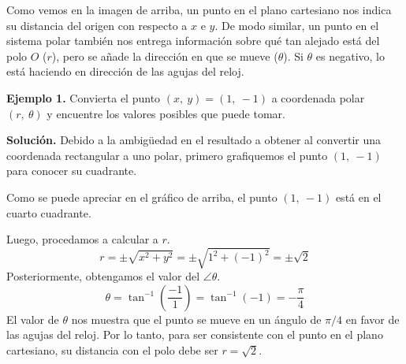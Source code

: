 \documentclass[12pt]{article}
\begin{document}
Como vemos en la imagen de arriba, un punto en el plano cartesiano nos indica su distancia del origen con respecto a $x$ e $y$. De modo similar, un punto en el sistema polar también nos entrega información sobre qué tan alejado está del polo $O$ ($r$), pero se añade la dirección en que se mueve ($\theta$). Si $\theta$ es negativo, lo está haciendo en dirección de las agujas del reloj.

\textbf{Ejemplo 1.} Convierta el punto $(x, \ y) = (1, \ -1)$ a coordenada polar $(r, \ \theta)$ y encuentre los valores posibles que puede tomar.

\textbf{Solución.} Debido a la ambigüedad en el resultado a obtener al convertir una coordenada rectangular a uno polar, primero grafiquemos el punto $(1, \ -1)$ para conocer su cuadrante.

\begin{figure}[hbt!]

\centering


\end{figure}

Como se puede apreciar en el gráfico de arriba, el punto $(1, \ -1)$ está en el cuarto cuadrante.

Luego, procedamos a calcular a $r$.
\[
  r = \pm \sqrt{x^{2} + y^{2}} = \pm \sqrt{1^{2} + (-1)^{2}} = \pm \sqrt{2}
\]
Posteriormente, obtengamos el valor del $\angle \theta$.
\[
  \theta = \tan^{-1}\left(\frac{-1}{1}\right) = \tan^{-1}(-1) = - \frac{\pi}{4}
\]
El valor de $\theta$ nos muestra que el punto se mueve en un ángulo de $\pi/4$ en favor de las agujas del reloj. Por lo tanto, para ser consistente con el punto en el plano cartesiano, su distancia con el polo debe ser $r = \sqrt{2}$.

\begin{figure}[hbt!]
\centering


\end{figure}
\end{document}
